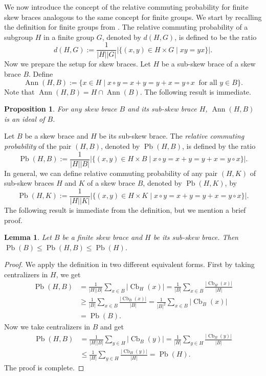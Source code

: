 \documentclass[10pt,a4paper]{amsart}
\numberwithin{equation}{section}
\newtheorem{pro}[equation]{Proposition}
\newtheorem{lem}[equation]{Lemma}
\newcommand{\Cb}{\operatorname{Cb} }
\newcommand{\Pb}{\operatorname{Pb} }
\newcommand{\Ann}{\operatorname{Ann} }
\begin{document}
We now introduce the  concept of the relative commuting probability for finite skew braces analogous to the same concept for finite groups. We start by recalling the definition for finite groups  from  \cite{ERL07}. The relative commuting probability of a subgroup $H$ in a finite group $G$,  denoted by $d(H, G)$, is  defined to be  the ratio
   $$d(H,G) := \frac{1}{|H||G|}|\{(x,y)\in H\times G \mid xy=yx\}|.$$
Now we prepare the setup for skew braces. Let $H$ be a sub-skew brace of a skew brace $B$.
Define $$\Ann(H,B) := \{x \in H \mid x \circ y = x + y = y + x = y \circ x~\mbox{ for all }  y \in B\}.$$
Note that $\Ann(H, B) = H \cap \Ann(B)$.  The following result is immediate. 
\begin{pro}
  For any skew brace $B$ and its sub-skew brace $H$,    $\Ann(H,B)$ is an ideal of $B$.
\end{pro}


 Let  $B$ be a skew brace  and $H$ be its sub-skew brace.    The \emph{relative commuting probability} of the pair  $(H, B)$, denoted by  $\Pb(H,B)$, is defined by the ratio
   $$\Pb(H,B) :=\frac{1}{|H||B|}|\{(x,y)\in H\times B \mid  x \circ y = x + y = y + x = y \circ x\}|.$$
  In general,  we can define relative commuting probability of any pair  $(H, K)$ of sub-skew braces $H$ and $K$ of a skew brace $B$, denoted by  $\Pb(H,K)$, by
       $$\Pb(H,K) :=\frac{1}{|H||K|}  |\{(x,y) \in H \times K \mid x \circ y = x + y = y + x = y \circ x\}|.$$
The following result is immediate   from the definition, but we mention a brief proof.    

\begin{lem} %
    Let $B$ be a finite skew brace and $H$ be its sub-skew brace. Then   $\Pb(B)\leqslant \Pb(H,B)\leqslant \Pb(H)$.
\end{lem}
\begin{proof}
We apply the definition in two different equivalent forms. First by taking centralizers in $H$, we get
      \begin{align*}
            \Pb(H,B)&=\frac{1}{|H||B|}\sum_{x\in B}|\Cb_{H}(x)| = \frac{1}{|B|}\sum_{x\in B}\frac{|\Cb_{H}(x)|}{|H|}\\
                     &\geqslant \frac{1}{|B|}\sum_{x\in B}\frac{|\Cb_{B}(x)|}{|B|} =\frac{1}{|B|^2}\sum_{x\in B}|\Cb_{B}(x)|\\
                     &=\Pb(B).
      \end{align*}
 Now we take centralizers in $B$ and get
      \begin{align*}
            \Pb(H,B)&=\frac{1}{|H||B|}\sum_{y\in H}|\Cb_{B}(y)| =\frac{1}{|H|}\sum_{y\in H}\frac{|\Cb_{B}(y)|}{|B|}\\
                     &\leqslant\frac{1}{|H|}\sum_{y\in H}\frac{|\Cb_{H}(y)|}{|H|}=\Pb(H). 
      \end{align*}
      The proof is complete.
\end{proof}
\end{document}
